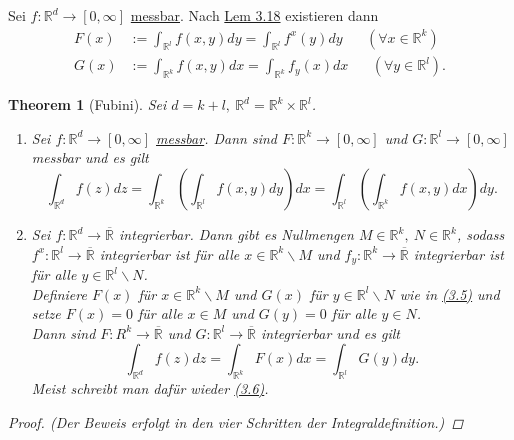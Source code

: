 \documentclass[a4paper]{report}
\newcommand{\R}{\mathbb{R}}
\newcommand{\Rq}{\overline{\R}}
\newcommand{\jlabel}[1]{\label{j_#1}}
\newcommand{\jhyperref}[2]{\hyperref[j_#1]{#2}}
\newcommand{\jlink}[1]{\jhyperref{#1}{#1}}
\newcommand{\jabb}[3]{ #1: #2 \rightarrow #3 }
\theoremstyle{plain}
\newtheorem{thm}{Theorem}[chapter]
\theoremstyle{definition}
\begin{document}
{{{{Sei $\jabb{f}{\R^d}{[0,\infty]}$ \jlink{messbar}. Nach \jlink{Lem 3.18} existieren dann
\jlabel{(3.5)}
\begin{equation}
    \begin{split}
        F(x) &:= \int_{\R^l} f(x,y)dy = \int_{\R^l}f^x(y)dy \hspace{20pt} (\forall x\in \R^k)\\
        G(x) &:= \int_{\R^k} f(x,y)dx = \int_{\R^k} f_y(x)dx \hspace{20pt} (\forall y\in \R^l).
    \end{split}
\end{equation}


\begin{thm}[Fubini]
\jlabel{Thm 3.27}
\jlabel{Fubini}
    Sei $d=k+l,\ \R^d = \R^k\times \R^l$.
    \begin{enumerate}
        \item
            \jlabel{FubiniA}
            Sei $\jabb{f}{\R^d}{[0,\infty]}$ \jlink{messbar}. Dann sind $\jabb{F}{\R^k}{[0,\infty]}$ und  $\jabb{G}{\R^l}{[0,\infty]}$ messbar und es gilt
            \jlabel{(3.6)}
            \begin{equation}
                \int_{\R^d} f(z)dz = \int_{\R^k} \left( \int_{\R^l} f(x,y)dy \right)dx = \int_{\R^l} \left( \int_{\R^k} f(x,y)dx \right)dy.
            \end{equation}
        \item
            \jlabel{FubiniB}
            Sei $\jabb{f}{\R^d}{\Rq}$ integrierbar. Dann gibt es Nullmengen $M\in\R^k,\ N\in \R^k$, sodass $\jabb{f^x}{\R^l}{\Rq}$ integrierbar ist für alle $x\in\R^k\backslash M$ und $\jabb{f_y}{\R^k}{\Rq}$ integrierbar ist für alle $y\in \R^l\backslash N$.\\
            Definiere $F(x)$ für $x\in \R^k\backslash M$ und $G(x)$ für $y\in \R^l\backslash N$ wie in \jlink{(3.5)} und setze $F(x)=0$ für alle $x\in M$ und $G(y)=0$ für alle $y\in N$.\\
            Dann sind $\jabb{F}{R^k}{\Rq}$ und $\jabb{G}{\R^l}{\Rq}$ integrierbar und es gilt
            \begin{displaymath}
                \int_{\R^d} f(z) dz = \int_{\R^k} F(x)dx = \int_{\R^l} G(y) dy.
            \end{displaymath}
            Meist schreibt man dafür wieder \jlink{(3.6)}.
    \end{enumerate}
    \begin{proof}
        (Der Beweis erfolgt in den vier Schritten der Integraldefinition.)

\end{proof}
\end{thm}}}}}
\end{document}
